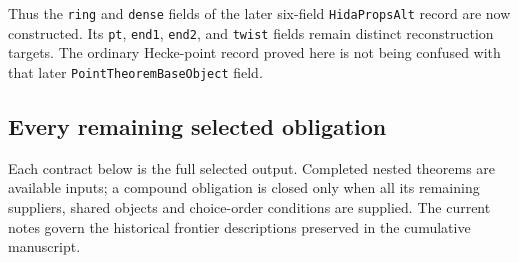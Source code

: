 Thus the \texttt{ring} and \texttt{dense} fields of the later
six-field \texttt{HidaPropsAlt} record are now constructed.
Its \texttt{pt}, \texttt{end1}, \texttt{end2}, and
\texttt{twist} fields remain distinct reconstruction targets.
The ordinary Hecke-point record proved here is not being confused
with that later \texttt{PointTheoremBaseObject} field.

\subsection{Every remaining selected obligation}

Each contract below is the full selected output.  Completed nested
theorems are available inputs; a compound obligation is closed only
when all its remaining suppliers, shared objects and choice-order
conditions are supplied.  The current notes govern the historical
frontier descriptions preserved in the cumulative manuscript.
